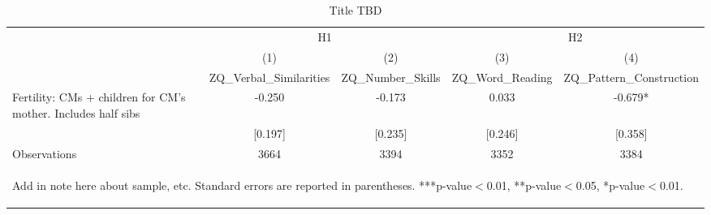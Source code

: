 \begin{table}[htbp]\centering
\def\sym#1{\ifmmode^{#1}\else\(^{#1}\)\fi}
\caption{Title TBD \label{tab:IPUMSWages}}
\begin{tabular}{l*{4}{c}}
\toprule
                    &\multicolumn{2}{c}{H1}         &\multicolumn{2}{c}{H2}         \\\cmidrule(lr){2-3}\cmidrule(lr){4-5}
                    &\multicolumn{1}{c}{(1)}   &\multicolumn{1}{c}{(2)}   &\multicolumn{1}{c}{(3)}   &\multicolumn{1}{c}{(4)}   \\
                    &ZQ\_Verbal\_Similarities   &ZQ\_Number\_Skills   &ZQ\_Word\_Reading   &ZQ\_Pattern\_Construction   \\
\midrule
Fertility: CMs + children for CM's mother. Includes half sibs&      -0.250   &      -0.173   &       0.033   &      -0.679*  \\
                    &     [0.197]   &     [0.235]   &     [0.246]   &     [0.358]   \\
\midrule
Observations        &        3664   &        3394   &        3352   &        3384   \\
\bottomrule\multicolumn{5}{p{14.6cm}}{\begin{footnotesize}        
Add in note here about sample, etc. Standard errors are reported in            parentheses. ***p-value$<$0.01, **p-value$<$0.05, *p-value$<$0.01.                                
\end{footnotesize}}\end{tabular}\end{table}
